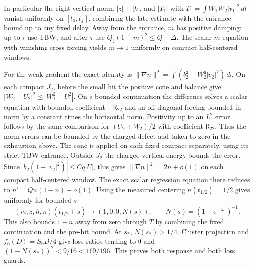 \documentclass[11pt]{article}
\newcommand{\dd}{\,dl}
\begin{document}
In particular the right vertical norm, $|z|+|h|$, and $|T_1|$ with $T_1=\int W_1W_2|v_1|^2\dd$ vanish uniformly on $[t_0,t_f]$, combining the late estimate with the entrance bound up to any fixed delay. Away from the entrance, $m$ has positive damping: up to $\tau$ use TBW, and after $\tau$ use $Q_1(1-m)^2\le Q-\Delta$. The scalar $m$ equation with vanishing cross forcing yields $m\to1$ uniformly on compact half-centered windows.

For the weak gradient the exact identity is
$\|\nabla n\|^2=\int(b_2^2+W_2^2|v_2|^2)\dd$.
On each compact $J_2$, before the small hit the positive cone and balance give $|W_2-U_2|^2\le|W_1^2-U_1^2|$. On a bounded continuation the difference solves a scalar equation with bounded coefficient $-\mathsf R_{22}$ and an off-diagonal forcing bounded in norm by a constant times the horizontal norm. Positivity up to an $L^2$ error follows by the same comparison for $(U_2+W_2)/2$ with coefficient $\mathsf R_{22}$. Thus the norm errors can be bounded by the charged defect and taken to zero in the exhaustion above. The cone is applied on each fixed compact separately, using its strict TBW entrance. Outside $J_2$ the charged vertical energy bounds the error. Since $|b_2(1-|v_2|^2)|\le Cq|U|$, this gives $\|\nabla n\|^2=2n+o(1)$ on each compact half-centered window. The exact scalar regression equation there reduces to $n'=Qn(1-n)+o(1)$. Using the measured centering $n(t_{1/2})=1/2$ gives uniformly for bounded $s$
\begin{equation}\label{an04ce5v1:logistic}
 (m,z,h,n)(t_{1/2}+s)\longrightarrow(1,0,0,N(s)),\qquad
 N(s)=(1+e^{-\lambda s})^{-1}.
\end{equation}
This also bounds $1-n$ away from zero through $T$ by combining the fixed continuation and the pre-hit bound. At $s_*$, $N(s_*)>1/4$. Cluster projection and $f_0(D)=S_0D/4$ give loss ratios tending to $0$ and $(1-N(s_*))^2<9/16<169/196$. This proves both response and both loss guards.
\end{document}
